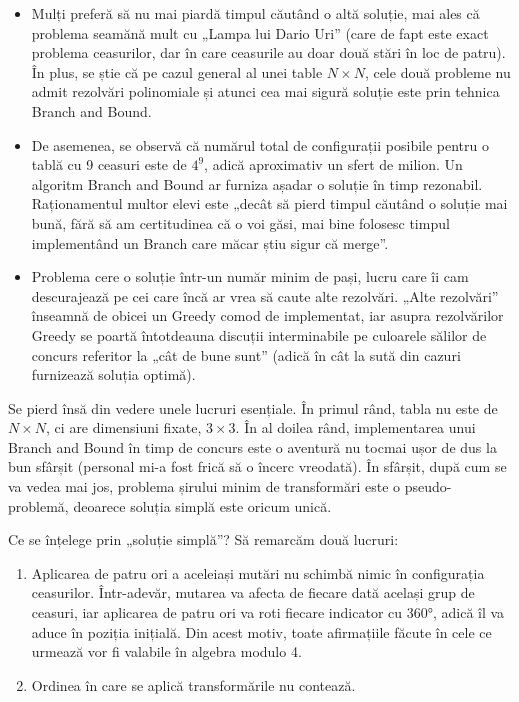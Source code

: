 \begin{itemize}

\item Mulți preferă să nu mai piardă timpul căutând o altă soluție, mai ales
  că problema seamănă mult cu „Lampa lui Dario Uri” (care de fapt este exact
  problema ceasurilor, dar în care ceasurile au doar două stări în loc de
  patru). În plus, se știe că pe cazul general al unei table $N \times N$,
  cele două probleme nu admit rezolvări polinomiale și atunci cea mai sigură
  soluție este prin tehnica Branch and Bound.

\item De asemenea, se observă că numărul total de configurații posibile pentru
  o tablă cu 9 ceasuri este de $4^9$, adică aproximativ un sfert de milion. Un
  algoritm Branch and Bound ar furniza așadar o soluție în timp
  rezonabil. Raționamentul multor elevi este „decât să pierd timpul căutând o
  soluție mai bună, fără să am certitudinea că o voi găsi, mai bine folosesc
  timpul implementând un Branch care măcar știu sigur că merge”.

\item Problema cere o soluție într-un număr minim de pași, lucru care îi cam
  descurajează pe cei care încă ar vrea să caute alte rezolvări. „Alte
  rezolvări” înseamnă de obicei un Greedy comod de implementat, iar asupra
  rezolvărilor Greedy se poartă întotdeauna discuții interminabile pe
  culoarele sălilor de concurs referitor la „cât de bune sunt” (adică în cât
  la sută din cazuri furnizează soluția optimă).

\end{itemize}

Se pierd însă din vedere unele lucruri esențiale. În primul rând, tabla nu
este de $N \times N$, ci are dimensiuni fixate, $3 \times 3$. În al doilea
rând, implementarea unui Branch and Bound în timp de concurs este o aventură
nu tocmai ușor de dus la bun sfârșit (personal mi-a fost frică să o încerc
vreodată). În sfârșit, după cum se va vedea mai jos, problema șirului minim de
transformări este o pseudo-problemă, deoarece soluția simplă este oricum
unică.

Ce se înțelege prin „soluție simplă”? Să remarcăm două lucruri:

\begin{enumerate}

\item Aplicarea de patru ori a aceleiași mutări nu schimbă nimic în
  configurația ceasurilor. Într-adevăr, mutarea va afecta de fiecare dată
  același grup de ceasuri, iar aplicarea de patru ori va roti fiecare
  indicator cu 360°, adică îl va aduce în poziția inițială. Din acest motiv,
  toate afirmațiile făcute în cele ce urmează vor fi valabile în algebra
  modulo 4.

\item Ordinea în care se aplică transformările nu contează.

\end{enumerate}

